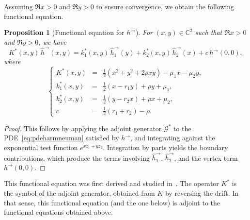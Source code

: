 \documentclass[11pt]{article}
\newtheorem{prop}[thm]{Proposition}
\theoremstyle{definition}
\begin{document}
Assuming $\Re x>0$ and $\Re y>0$ to ensure convergence, we obtain the following functional equation.

\begin{prop}[Functional equation for $h^\rightarrow$]
For $(x,y)\in\mathbb C^2$ such that $\Re x>0$ and $\Re y>0$, we have
\begin{equation}
\label{eq:FE_h_right}
K^*(x,y)\,\widehat h^\rightarrow(x,y)
=
k_1^*(x,y)\,\widehat h^\rightarrow_1(y)
+
k_2^*(x,y)\,\widehat h^\rightarrow_2(x)
+
c\,h^\rightarrow(0,0),
\end{equation}
where
\begin{equation}
\label{eq:def_parameters_adjoint}
    \left\{
    \begin{array}{rcl}
    K^*(x,y) & = & \frac{1}{2}(x^2+y^2+2\rho xy)-\mu_1x-\mu_2y,\\
    k_1^*(x,y) & = & \frac{1}{2} (x-r_1 y)+\rho y +\mu_1,\\
    k_2^*(x,y) & = & \frac{1}{2} (y-r_2 x)+\rho x +\mu_2,\\
    c & = & \frac{1}{2}(r_1+r_2)-\rho.
    \end{array}
    \right.
\end{equation}
\end{prop}

\begin{proof}
This follows by applying the adjoint generator $\mathcal{G}^*$ to the PDE~\eqref{eq:pdeharmneuman} satisfied by $h^\rightarrow$, and integrating against the exponential test function $e^{x z_1+y z_2}$. Integration by parts yields the boundary contributions, which produce the terms involving $\widehat h^\rightarrow_1$, $\widehat h^\rightarrow_2$, and the vertex term $h^\rightarrow(0,0)$.
\end{proof}
This functional equation was first derived and studied in~\cite{franceschi_fomichov_ivanovs_2022}.
The operator $K^*$ is the symbol of the adjoint generator, obtained from $K$ by reversing the drift. In that sense, this functional equation (and the one below) is adjoint to the functional equations obtained above.
\end{document}
